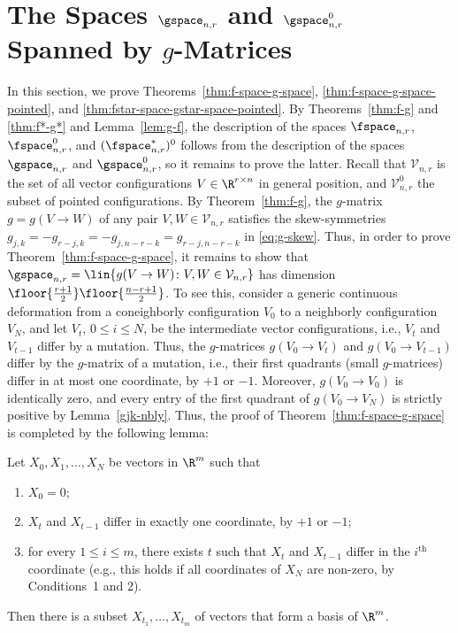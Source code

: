 \section{The Spaces $\gspace_{n,r}$ and $\gspace_{n,r}^0$ Spanned by $g$-Matrices}
\label{sec:g-space}
%
In this section, we prove Theorems~\ref{thm:f-space-g-space}, \ref{thm:f-space-g-space-pointed}, and \ref{thm:fstar-space-gstar-space-pointed}. By Theorems~\ref{thm:f-g} and \ref{thm:f*-g*} and Lemma~\ref{lem:g-f}, the description of the spaces $\fspace_{n,r}$, $\fspace^0_{n,r}$, and $(\fspace^*_{n,r})^0$ follows from the description of the spaces $\gspace_{n,r}$ and $\gspace_{n,r}^0$, so it remains to prove the latter. 
%
Recall that $\mathcal{V}_{n,r}$ is the set of all vector configurations $V\in \R^{r\times n}$ in general position, and $\mathcal{V}_{n,r}^0$ the subset of pointed configurations.
%
By Theorem~\ref{thm:f-g}, the $g$-matrix $g=g(V\to W)$ of any pair $V,W\in \mathcal{V}_{n,r}$ satisfies the skew-symmetries $g_{j,k}=-g_{r-j,k}=-g_{j,n-r-k}=g_{r-j,n-r-k}$ in \eqref{eq:g-skew}. Thus, in order to prove Theorem~\ref{thm:f-space-g-space}, it remains to show that $\gspace_{n,r}=\lin\{g(V\to W)\colon V,W\in \mathcal{V}_{n,r}\}$ has dimension $\floor{\frac{r+1}{2}} \floor{\frac{n-r+1}{2}}$. To see this, consider a generic continuous deformation from a coneighborly configuration $V_0$ to a neighborly configuration $V_N$, and let $V_t$, $0\leq i \leq N$,  be the intermediate vector configurations, i.e., $V_t$ and $V_{t-1}$ differ by a mutation. Thus, the $g$-matrices $g(V_0\to V_t)$ and $g(V_0\to V_{t-1})$ differ by the $g$-matrix of a mutation, i.e., their first quadrants (small $g$-matrices) differ in at most one coordinate, by $+1$ or $-1$. Moreover, $g(V_0\to V_0)$ is identically zero, and every entry of the first quadrant of $g(V_0\to V_N)$ is strictly positive by Lemma~\ref{gjk-nbly}. Thus, the proof of Theorem~\ref{thm:f-space-g-space} is completed by the following lemma:
%
\begin{lemma} 
\label{lem:basis1}
Let $X_0,X_1,\dots,X_N$ be vectors in $\R^m$ such that
\label{lem:basis}
\begin{enumerate}
\item $X_0=0$;
\item $X_t$ and $X_{t-1}$ differ in exactly one coordinate, by $+1$ or $-1$;
\item for every $1 \leq i \leq m$, there exists $t$ such that $X_t$ and $X_{t-1}$ differ in the $i^{\text{th}}$ coordinate
(e.g., this holds if all coordinates of $X_N$ are non-zero, by Conditions~1 and 2).
\end{enumerate}
Then there is a subset $X_{t_1}, \dots, X_{t_m}$ of vectors that form a basis of $\R^m$.
\end{lemma}
